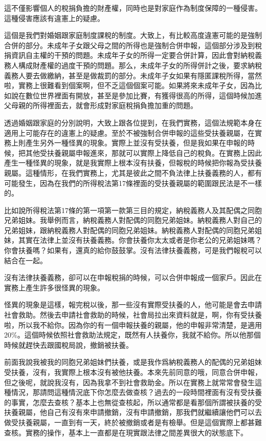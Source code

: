 \documentclass[oneside,sub3section]{ctexbook}
\begin{document}
這不僅影響個人的稅捐負擔的財產權，同時也是對家庭作為制度保障的一種侵害。這種侵害應該有違憲上的疑慮。

這個是我們對婚姻跟家庭制度課稅的制度。大致上，有比較高度違憲可能的是強制合併的部分。未成年子女跟父母之間的所得也是強制合併申報，這個部分涉及到稅捐資訊自主權的干預的問題。未成年子女的所得一定要合併計算，因此會對納稅義務人構成財產權的過度干預的問題。那么，未成年子女的所得併計之後，要求納稅義務人要去做繳納，甚至是做裁罰的部分。未成年子女如果有隱匿課稅所得，當然啦，實務上很難看到個案啊，但不乏這個個案可能。如果將來未成年子女，因為比如說在數位世界裡面有開放，甚至是參加比賽，有獲得很高的所得，這個時候加進父母親的所得裡面去，就會形成對家庭稅捐負擔加重的問題。

透過婚姻跟家庭的分別說明，大致上跟各位提到，在我們實務，這個法規範本身在適用上可能存在的違憲上的疑慮。至於不被強制合併申報的這些受扶養親屬，在實務上則產生另外一種怪異的現象。實際上並沒有受扶養，但是我如果在申報的時候，把其他受扶養親屬申報進來，那就可以實際上降低自己的稅負。在實務上因此產生一種怪異的現象，就是我實際上根本沒有扶養，但報稅的時候把你報為受扶養親屬。這種情形，在我們實務上，尤其是彼此之間不負法律上扶養義務的人，都有可能發生，因為在我們的所得稅法第17條裡面的受扶養親屬的範圍跟民法是不一樣的。

比如說所得稅法第17條的第一項第一款第三目的規定，納稅義務人及其配偶之同胞兄弟姐妹。我舉例而言，納稅義務人對配偶的同胞兄弟姐妹。納稅義務人對自己的兄弟姐妹，跟納稅義務人對配偶的同胞兄弟姐妹。納稅義務人對配偶的同胞兄弟姐妹，其實在法律上並沒有扶養義務。你會扶養你太太或者是你老公的兄弟姐妹嗎？你會扶養嗎？如果有，還真的給你鼓鼓掌。沒有法律扶養義務，可是我們報稅可以結合在一起。

沒有法律扶養義務，卻可以在申報稅捐的時候，可以合併申報成一個家戶。因此在實務上產生許多很怪異的現象。

怪異的現象是這樣，報完稅以後，那一些沒有實際受扶養的人，他可能是會去申請社會救助。然後去申請社會救助的時候，社會局拉出來資料就是，啊，你有受扶養啦，所以我不給你。因為你的有一個申報扶養的親屬，他的申報非常清楚，是適用20\%。這個時候依照社會救助法規定，既然有人扶養你，我就不給你。所以他那個時候就趕快去跟國稅局說，撤銷被扶養。

前面我說我被我的同胞兄弟姐妹們扶養，或是我作爲納稅義務人的配偶的兄弟姐妹受扶養，沒有，我實際上根本沒有被他扶養。本來先前同意的哦，同意合併申報，但之後呢，就說我沒有，因為我拿不到社會救助金。所以在實務上就常常會發生這種情況，那請問這種情況底下你怎麼去做查核？過去的一段時間裡面有沒有受扶養的事實，怎麼去查核？基本上也無從查核起，所以通常都是看那個所謂被扶養的受扶養親屬，他自己有沒有來申請撤銷，沒有申請撤銷，那我們就繼續讓他們可以去做受扶養親屬，一直到有一天，終於被撤銷或者是有檢舉。但是這個實際上都甚難查核。實務的操作，基本上一直都是在現實跟法律之間差異很大的狀態底下。
\end{document}
